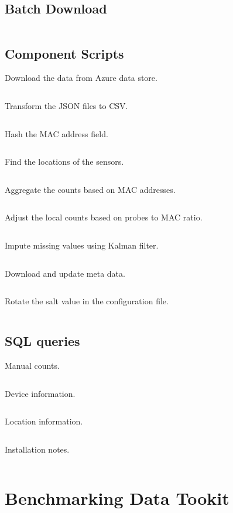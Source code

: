 \subsection{Batch Download}
\vspace{1em}
\inputminted{bash}{tools/pipeline/batch}

\subsection{Component Scripts}
\vspace{1em}
Download the data from Azure data store.
\inputminted{bash}{tools/pipeline/scripts/download}
Transform the JSON files to CSV.
\inputminted{bash}{tools/pipeline/scripts/flatten}
Hash the MAC address field.
\inputminted{R}{tools/pipeline/scripts/hash}
Find the locations of the sensors.
\inputminted{bash}{tools/pipeline/scripts/locate}
Aggregate the counts based on MAC addresses.
\inputminted{R}{tools/pipeline/scripts/count}
Adjust the local counts based on probes to MAC ratio.
\inputminted{R}{tools/pipeline/scripts/adjust}
Impute missing values using Kalman filter.
\inputminted{R}{tools/pipeline/scripts/impute}
Download and update meta data.
\inputminted{bash}{tools/pipeline/scripts/meta_data}
Rotate the salt value in the configuration file.
\inputminted{bash}{tools/pipeline/scripts/rotate_salt}

\subsection{SQL queries}
\vspace{1em}
Manual counts.
\inputminted{sql}{tools/pipeline/queries/calibrations}
Device information.
\inputminted{sql}{tools/pipeline/queries/devices}
Location information.
\inputminted{sql}{tools/pipeline/queries/locations}
Installation notes.
\inputminted{sql}{tools/pipeline/queries/installs}

\section{Benchmarking Data Tookit} \label{appendix:benchmark}

